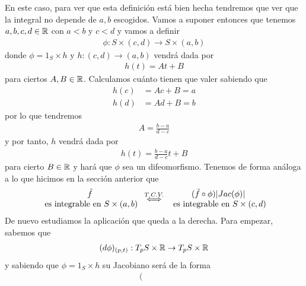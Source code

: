 \begin{observacion}
    En este caso, para ver que esta definición está bien hecha tendremos que ver que la integral no depende de $a,b$ escogidos. Vamos a suponer entonces que tenemos $a,b,c,d\in \mathbb{R}$ con $a<b$ y $c<d$ y vamos a definir
    \begin{gather*}
        \phi: S \times (c,d) \to S\times(a,b)
    \end{gather*}
    donde $\phi=1_S\times h$ y $h:(c,d) \to (a,b)$ vendrá dada por 
    \begin{gather*}
        h(t) = At + B
    \end{gather*}
    para ciertos $A,B\in \mathbb{R}$. Calculamos cuánto tienen que valer sabiendo que 
    \begin{align*}
        h(c) &= Ac + B = a\\
        h(d) &= Ad + B = b
    \end{align*}
    por lo que tendremos 
    \begin{gather*}
        A = \frac{b-a}{d-c}
    \end{gather*}
    y por tanto, $h$ vendrá dada por 
    \begin{gather*}
        h(t) = \frac{b-a}{d-c}t + B
    \end{gather*}
    para cierto $B\in \mathbb{R}$ y hará que $\phi$ sea un difeomorfismo. Tenemos de forma análoga a lo que hicimos en la sección anterior que 
    \begin{gather*}
        \begin{array}{c}
            \tilde{f}\\
            \text{ es integrable en $S\times(a,b)$}
        \end{array}
        \overset{T.C.V.}{\iff}
        \begin{array}{c}
            (\tilde{f} \circ \phi) |Jac(\phi)|\\
            \text{ es integrable en $S\times(c,d)$}
        \end{array}
    \end{gather*}
    De nuevo estudiamos la aplicación que queda a la derecha. Para empezar, sabemos que
    \begin{gather*}
        (d\phi)_{(p,t)} : T_pS\times \mathbb{R} \to T_pS\times \mathbb{R}
    \end{gather*}
    y sabiendo que $\phi=1_S \times h$ su Jacobiano será de la forma
    \begin{gather*}
        \left(
        \begin{array}{ccc|c}
            &&&\\

\end{array}
\end{gather*}
\end{observacion}
